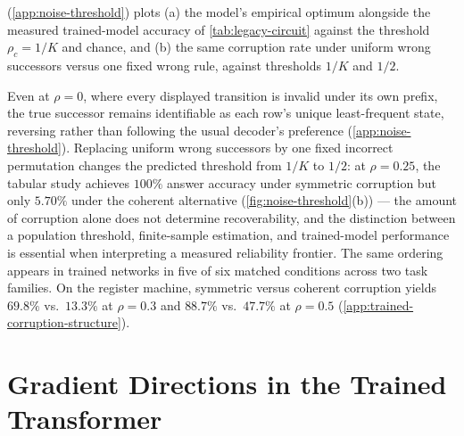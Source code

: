  (\cref{app:noise-threshold}) plots (a) the
model's empirical optimum alongside the measured trained-model accuracy
of \cref{tab:legacy-circuit} against the threshold \(\rho_c=1/K\) and
chance, and (b) the same corruption rate under uniform wrong successors
versus one fixed wrong rule, against thresholds \(1/K\) and \(1/2\).

Even at $\rho=0$, where every displayed transition is invalid under its own
prefix, the true successor remains identifiable as each row's unique
least-frequent state, reversing rather than following the usual decoder's
preference (\cref{app:noise-threshold}). Replacing uniform wrong
successors by one fixed incorrect permutation changes the predicted
threshold from $1/K$ to $1/2$: at $\rho=0.25$, the tabular study achieves
$100\%$ answer accuracy under symmetric corruption but only $5.70\%$ under
the coherent alternative (\cref{fig:noise-threshold}(b)) --- the amount of
corruption alone does not determine recoverability, and the distinction
between a population threshold, finite-sample estimation, and
trained-model performance is essential when interpreting a measured
reliability frontier. The same ordering appears in trained networks in
five of six matched conditions across two task families. On the register
machine, symmetric versus coherent corruption yields $69.8\%$ vs.\
$13.3\%$ at $\rho=0.3$ and $88.7\%$ vs.\ $47.7\%$ at $\rho=0.5$
(\cref{app:trained-corruption-structure}).

\section{Gradient Directions in the Trained Transformer}
\label{sec:gradient-alignment}

